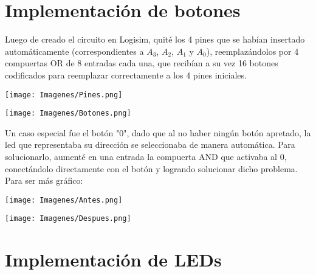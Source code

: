 \documentclass[a4paper,12pt]{article}
\begin{document}
\newpage

\section{Implementación de botones}

Luego de creado el circuito en Logisim, quité los 4 pines que se habían insertado automáticamente (correspondientes a $A_3$, $A_2$, $A_1$ y $A_0$), reemplazándolos por 4 compuertas OR de 8 entradas cada una, que recibían a su vez 16 botones codificados para reemplazar correctamente a los 4 pines iniciales.

\begin{minipage}[t]{0.4\linewidth}
   \vspace{2ex}
   \begin{center}
       \texttt{[image: Imagenes/Pines.png]}
   \end{center}
\end{minipage}
\hfill
\begin{minipage}[t]{0.4\linewidth}
   \vspace{2ex}
   \begin{center}
        \texttt{[image: Imagenes/Botones.png]}
   \end{center}
   
\end{minipage}
\newpage
Un caso especial fue el botón "0", dado que al no haber ningún botón apretado, la led que representaba su dirección se seleccionaba de manera automática. Para solucionarlo, aumenté en una entrada la compuerta AND que activaba al 0, conectándolo directamente con el botón y logrando solucionar dicho problema. Para ser más gráfico:

\begin{minipage}[t]{0.4\linewidth}
   \vspace{2ex}
   \texttt{[image: Imagenes/Antes.png]}
\end{minipage}
\hfill
\begin{minipage}[t]{0.4\linewidth}
   \vspace{2ex}
   \texttt{[image: Imagenes/Despues.png]}
\end{minipage}

\section{Implementación de LEDs}
\end{document}
